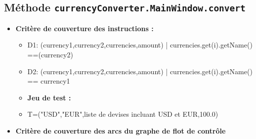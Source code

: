 \documentclass[letterpaper, 10pt]{article}
\begin{document}
\subsection*{Méthode \texttt{currencyConverter.MainWindow.convert}}   
\begin{itemize}
\item \textbf{Critère de couverture des instructions :}
        \begin{itemize}
          \item D1: {(currency1,currency2,currencies,amount) | currencies.get(i).getName() ==(currency2)}
         \item D2: {(currency1,currency2,currencies,amount) | currencies.get(i).getName() == currency1}
        
    \item \textbf{Jeu de test :}
      
            \item T={("USD","EUR",liste de devises incluant USD et EUR,100.0)}\\
        \end{itemize}

\item \textbf{Critère de couverture des arcs du graphe de flot de contrôle}


\end{itemize}
\end{document}
